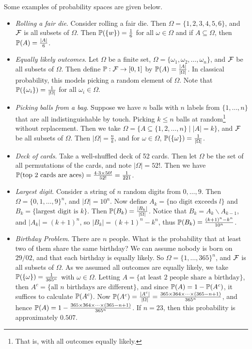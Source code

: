 \documentclass[a4paper]{scrreprt}
\begin{document}
\begin{example}
	Some examples of probability spaces are given below.
	\begin{itemize}
		\item \emph{Rolling a fair die}. Consider rolling a fair die. Then
		$
		\Omega = \{1, 2, 3, 4, 5, 6\}
		$, and $\mathcal{F}$ is all subsets of $\Omega$.
		Then $\mathbb{P}(\{w\}) = \frac{1}{6}$ for all $\omega \in \Omega$ and if $A \subseteq \Omega$, then $\mathbb{P}(A) = \frac{|A|}{6}$.
		\item \emph{Equally likely outcomes}. Let $\Omega$ be a finite set, $\Omega = \{\omega_1, \omega_2, \dots, \omega_n \}$, and $\mathcal{F}$ be all subsets of $\Omega$. Then define $\mathbb{P} : \mathcal{F} \rightarrow [0, 1]$ by $\mathbb{P}(A) = \frac{|A|}{|\Omega|}$. In classical probability, this models picking a random element of $\Omega$. Note that $\mathbb{P}(\{\omega_i\}) = \frac{1}{|\Omega|}$ for all $\omega_i \in \Omega$.
		\item \emph{Picking balls from a bag}. Suppose we have $n$ balls with $n$ labels from $\{1, \dots, n\}$ that are all indistinguishable by touch. Picking $k \leq n$ balls at random\footnote{That is, with all outcomes equally likely.} without replacement. Then we take $\Omega = \{A \subseteq \{1, 2, \dots, n\} \mid |A| = k \}$, and $\mathcal{F}$ be all subsets of $\Omega$. Then $|\Omega| = \frac{n}{k}$, and for $\omega \in \Omega$, $\mathbb{P}(\{\omega\}) = \frac{1}{|\Omega|}$.
		\item \emph{Deck of cards}. Take a well-shuffled deck of 52 cards. Then let $\Omega$ be the set of all permutations of the cards, and note $|\Omega| = 52!$. Then we have $\mathbb{P}(\text{top 2 cards are aces}) = \frac{4 \cdot 3 \times 50!}{52!} = \frac{1}{221}$.
		\item \emph{Largest digit}. Consider a string of $n$ random digits from $0, \dots, 9$. Then $\Omega = \{0, 1, \dots, 9\}^n$, and $|\Omega| = 10^n$. Now define $A_k = \{\text{no digit exceeds }l\}$ and $B_k = \{\text{largest digit is }k\}$. Then $\mathbb{P}(B_k) = \frac{|B_k|}{|\Omega|}$. Notice that $B_k = A_k \backslash A_{k - 1}$, and $|A_k| = (k + 1)^n$, so $|B_k| = (k + 1)^n - k^n$, thus $\mathbb{P}(B_k) = \frac{(k + 1)^n - k^n}{10^n}$.
		\item \emph{Birthday Problem}. There are $n$ people. What is the probability that at least two of them share the same birthday? We can assume nobody is born on $29/02$, and that each birthday is equally likely. So $\Omega = \{1, \dots, 365\}^n$, and $\mathcal{F}$ is all subsets of $\Omega$. As we assumed all outcomes are equally likely, we take $\mathbb{P}(\{\omega\}) = \frac{1}{365^n}$ with $\omega \in \Omega$.
		Letting $A = \{\text{at least 2 people share a birthday}\}$, then $A^c = \{\text{all $n$ birthdays are different}\}$, and since $\mathbb{P}(A) = 1 - \mathbb{P}(A^c)$, it suffices to calculate $\mathbb{P}(A^c)$. Now $\mathbb{P}(A^c) = \frac{|A^c|}{|\Omega|} = \frac{365 \times 364 \times \cdots \times (365 - n + 1)}{365^n}$, and hence $\mathbb{P}(A) = 1 - \frac{365 \times 364 \times \cdots \times (365 - n + 1)}{365^n}$. If $n = 23$, then this probability is approximately $0.507$.
\end{itemize}
\end{example}
\end{document}
